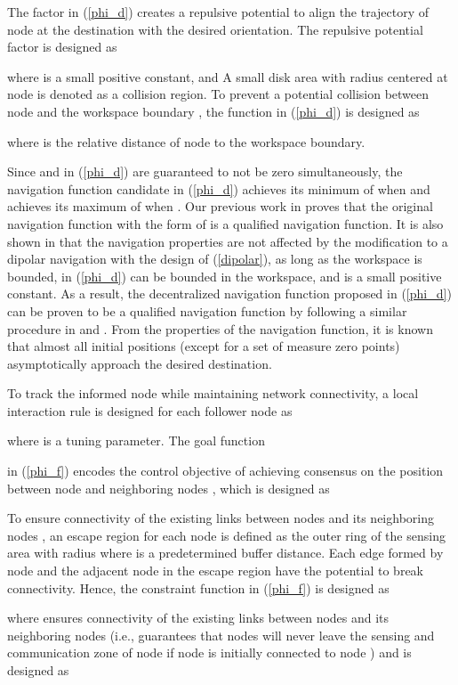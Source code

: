 \documentclass[english]{IOS-Book-Article}
\theoremstyle{definition}
\theoremstyle{definition}
\begin{document}
The factor  in (\ref{phi_d})
creates a repulsive potential to align the trajectory of node 
at the destination with the desired orientation. The repulsive potential
factor is designed as

where  is a small positive constant, and  A small disk area with radius  centered at node 
is denoted as a collision region. To prevent a potential collision
between node  and the workspace boundary ,
the function 
in (\ref{phi_d}) is designed as

where 
is the relative distance of node  to the workspace boundary.

Since  and  in (\ref{phi_d}) are guaranteed
to not be zero simultaneously, the navigation function candidate in
(\ref{phi_d}) achieves its minimum of  when  and
achieves its maximum of  when . Our previous work
in \cite{Kan.Dani.ea2012} proves that the original navigation function
with the form of 
is a qualified navigation function. It is also shown in \cite{loizou2008}
that the navigation properties are not affected by the modification
to a dipolar navigation with the design of (\ref{dipolar}), as long
as the workspace is bounded,  in (\ref{phi_d}) can be bounded
in the workspace, and  is a small positive constant.
As a result, the decentralized navigation function 
proposed in (\ref{phi_d}) can be proven to be a qualified navigation
function by following a similar procedure in \cite{loizou2008} and
\cite{Kan.Dani.ea2012}. From the properties of the navigation function,
it is known that almost all initial positions (except for a set of
measure zero points) asymptotically approach the desired destination.

To track the informed node while maintaining network connectivity,
a local interaction rule is designed for each follower node 
as 

where  is a tuning parameter. The goal function

in (\ref{phi_f}) encodes the control objective of achieving consensus
on the position between node  and neighboring nodes ,
which is designed as 

To ensure connectivity of the existing links between nodes  and
its neighboring nodes , an escape region for
each node is defined as the outer ring of the sensing area with radius
  where  is
a predetermined buffer distance. Each edge formed by node  and
the adjacent node  in the escape region have
the potential to break connectivity. Hence, the constraint function
 in (\ref{phi_f})
is designed as 

where   
ensures connectivity of the existing links between nodes  and
its neighboring nodes  (i.e., guarantees that
nodes  will never leave the sensing and communication
zone of node  if node  is initially connected to node )
and is designed as\ 
\end{document}
